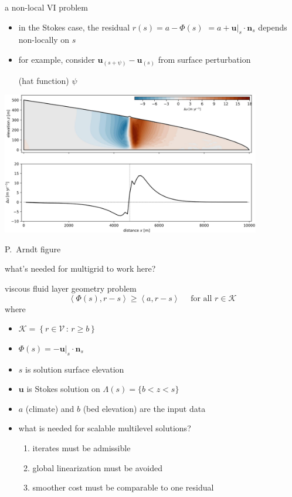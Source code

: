 \documentclass[svgnames,
               hyperref={colorlinks,citecolor=DeepPink4,linkcolor=FireBrick,urlcolor=Maroon},
               usepdftitle=false]  %
               {beamer}
\newcommand{\bn}{\mathbf{n}}
\newcommand{\bu}{\mathbf{u}}
\newcommand{\ip}[2]{\left<#1,#2\right>}
\begin{document}
\begin{frame}{a non-local VI problem}

\begin{itemize}
\item in the Stokes case, the residual $r(s) = a - \Phi(s)$ $= a + \bu|_s \cdot \bn_s$ \alert{depends non-locally on $s$}
\item for example, consider $\bu_{(s+\psi)} - \bu_{(s)}$ from surface perturbation

(hat function) $\psi$
\end{itemize}

\medskip
\begin{center}
\includegraphics[width=0.85\textwidth]{images/stokes-greens-arndt.png}
\end{center}

\vspace{-5mm}
\hfill {\tiny P.~Arndt figure}
\end{frame}


\begin{frame}{what's needed for multigrid to work here?}

\begin{block}{viscous fluid layer geometry problem}
	$$\ip{\Phi(s)}{r-s} \ge \ip{a}{r-s} \quad \text{ for all } r \in \mathcal{K}$$
where
\begin{itemize}
\item $\mathcal{K} = \left\{r \in \mathcal{V} \,:\, r \ge b\right\}$
\item $\Phi(s)=- \bu|_s \cdot \bn_s$
\item $s$ is solution surface elevation
\item $\bu$ is Stokes solution on $\Lambda(s) = \{b < z < s\}$
\item $a$ (climate) and $b$ (bed elevation) are the input data
\end{itemize} 
\end{block}

\bigskip
\begin{itemize}
\item what is needed for scalable multilevel solutions?
    \begin{enumerate}
    \item<2>[1.] iterates must be admissible
    \item<2>[2.] global linearization must be avoided
    \item<2>[3.] smoother cost must be comparable to one residual    
    \end{enumerate}
\end{itemize}
\end{frame}
\end{document}
